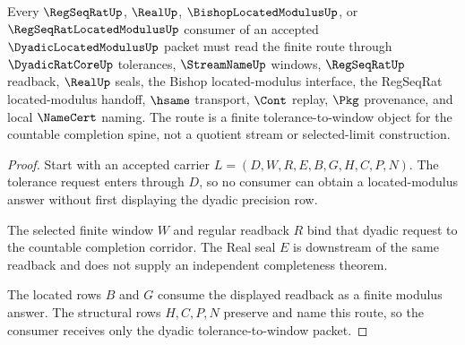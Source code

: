 \begin{theorem}
\label{thm:dyadic-located-modulus-regseqrat-route}
Every $\RegSeqRatUp$, $\RealUp$, $\BishopLocatedModulusUp$, or $\RegSeqRatLocatedModulusUp$ consumer of an accepted $\DyadicLocatedModulusUp$ packet must read the finite route through $\DyadicRatCoreUp$ tolerances, $\StreamNameUp$ windows, $\RegSeqRatUp$ readback, $\RealUp$ seals, the Bishop located-modulus interface, the RegSeqRat located-modulus handoff, $\hsame$ transport, $\Cont$ replay, $\Pkg$ provenance, and local $\NameCert$ naming. The route is a finite tolerance-to-window object for the countable completion spine, not a quotient stream or selected-limit construction.
\end{theorem}
\begin{proof}
Start with an accepted carrier $L=(D,W,R,E,B,G,H,C,P,N)$. The tolerance request enters through $D$, so no consumer can obtain a located-modulus answer without first displaying the dyadic precision row.

The selected finite window $W$ and regular readback $R$ bind that dyadic request to the countable completion corridor. The Real seal $E$ is downstream of the same readback and does not supply an independent completeness theorem.

The located rows $B$ and $G$ consume the displayed readback as a finite modulus answer. The structural rows $H,C,P,N$ preserve and name this route, so the consumer receives only the dyadic tolerance-to-window packet.
\end{proof}





